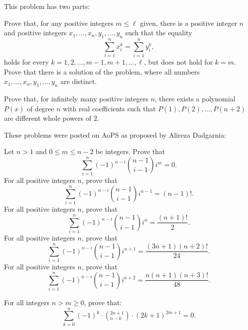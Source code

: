 \begin{question}[name={2011 Ibero American}]
    This problem has two parts:
    \begin{tasks}
        \task Prove that, for any positive integers $m\le \ell$ given, there is a positive integer $n$ and positive integers $x_1,\dots,x_n,y_1,\dots,y_n$ such that the equality \[ \sum_{i=1}^nx_i^k=\sum_{i=1}^ny_i^k,\] holds for every $k=1,2,\dots,m-1,m+1,\dots,\ell$, but does not hold for $k=m$.
        \task Prove that there is a solution of the problem, where all numbers $x_1,\dots,x_n,y_1,\dots,y_n$ are distinct.
    \end{tasks}
\end{question}




\begin{question}[name={Komal}]
    Prove that, for infinitely many positive integers $n$, there exists a polynomial $P(x)$ of degree $n$ with real coefficients such that $P(1), P(2), \dots, P(n+2)$ are different whole powers of $2$.
\end{question}


\begin{question}[name={Dadgarnia Finite Difference Identities}]
These problems were posted on AoPS as proposed by Alireza Dadgarnia:
\begin{tasks}
\task Let $n>1$ and $0\leq m\leq n-2$ be integers. Prove that
$$\sum_{i=1}^{n}(-1)^{n-i}\binom{n-1}{i-1}i^m=0.$$
\task For all positive integers $n$, prove that
$$\sum_{i=1}^{n}(-1)^{n-i}\binom{n-1}{i-1}i^{n-1}=(n-1)!.$$
\task For all positive integers $n$, prove that
$$\sum_{i=1}^{n}(-1)^{n-i}\binom{n-1}{i-1}i^{n}=\frac{(n+1)!}{2}.$$
\task For all positive integers $n$, prove that
$$\sum_{i=1}^{n}(-1)^{n-i}\binom{n-1}{i-1}i^{n+1}=\frac{(3n+1)(n+2)!}{24}.$$
\task For all positive integers $n$, prove that
$$\sum_{i=1}^{n}(-1)^{n-i}\binom{n-1}{i-1}i^{n+2}=\frac{n(n+1)(n+3)!}{48}.$$
\end{tasks}
\end{question}


\begin{question}[name={Crux, by Max A. Alekseyev}]
    For all integers $n>m\geq 0$, prove that: \[\sum_{k=0}^{n}\left(-1\right)^{k}\cdotp\left(_{n-k}^{2n+1}\right)\cdotp\left(2k+1\right)^{2m+1}=0.\]
\end{question}

